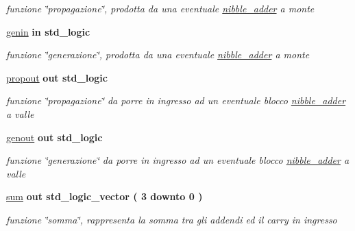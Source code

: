\begin{DoxyCompactItemize}
\begin{DoxyCompactList}\small\item\em funzione \char`\"{}propagazione\char`\"{}, prodotta da una eventuale \hyperlink{classnibble__adder}{nibble\+\_\+adder} a monte \end{DoxyCompactList}\item 
\hyperlink{group___nibble_adder_ga0a46d5193cb73eb993bc5d4f69741d0a}{genin}  {\bfseries {\bfseries \textcolor{vhdlchar}{in}\textcolor{vhdlchar}{ }}} {\bfseries \textcolor{vhdlchar}{std\+\_\+logic}\textcolor{vhdlchar}{ }} 
\begin{DoxyCompactList}\small\item\em funzione \char`\"{}generazione\char`\"{}, prodotta da una eventuale \hyperlink{classnibble__adder}{nibble\+\_\+adder} a monte \end{DoxyCompactList}\item 
\hyperlink{group___nibble_adder_ga5957c9cdd706cafd2da8855133a002c9}{propout}  {\bfseries {\bfseries \textcolor{vhdlchar}{out}\textcolor{vhdlchar}{ }}} {\bfseries \textcolor{vhdlchar}{std\+\_\+logic}\textcolor{vhdlchar}{ }} 
\begin{DoxyCompactList}\small\item\em funzione \char`\"{}propagazione\char`\"{} da porre in ingresso ad un eventuale blocco \hyperlink{classnibble__adder}{nibble\+\_\+adder} a valle \end{DoxyCompactList}\item 
\hyperlink{group___nibble_adder_ga068cd5c4d23e284cb942702252ed1491}{genout}  {\bfseries {\bfseries \textcolor{vhdlchar}{out}\textcolor{vhdlchar}{ }}} {\bfseries \textcolor{vhdlchar}{std\+\_\+logic}\textcolor{vhdlchar}{ }} 
\begin{DoxyCompactList}\small\item\em funzione \char`\"{}generazione\char`\"{} da porre in ingresso ad un eventuale blocco \hyperlink{classnibble__adder}{nibble\+\_\+adder} a valle \end{DoxyCompactList}\item 
\hyperlink{group___nibble_adder_gadfe538323c3296159dd3b383325a996b}{sum}  {\bfseries {\bfseries \textcolor{vhdlchar}{out}\textcolor{vhdlchar}{ }}} {\bfseries \textcolor{vhdlchar}{std\+\_\+logic\+\_\+vector}\textcolor{vhdlchar}{ }\textcolor{vhdlchar}{(}\textcolor{vhdlchar}{ }\textcolor{vhdlchar}{ } \textcolor{vhdldigit}{3} \textcolor{vhdlchar}{ }\textcolor{vhdlchar}{downto}\textcolor{vhdlchar}{ }\textcolor{vhdlchar}{ } \textcolor{vhdldigit}{0} \textcolor{vhdlchar}{ }\textcolor{vhdlchar}{)}\textcolor{vhdlchar}{ }} 
\begin{DoxyCompactList}\small\item\em funzione \char`\"{}somma\char`\"{}, rappresenta la somma tra gli addendi ed il carry in ingresso \end{DoxyCompactList}\end{DoxyCompactItemize}
